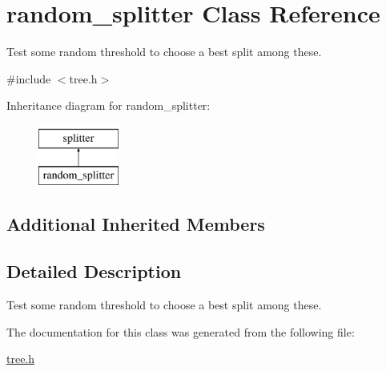 \hypertarget{classrandom__splitter}{\section{random\+\_\+splitter Class Reference}
\label{classrandom__splitter}
}


Test some random threshold to choose a best split among these.  




{\ttfamily \#include $<$tree.\+h$>$}

Inheritance diagram for random\+\_\+splitter\+:\begin{figure}[H]
\begin{center}
\leavevmode
\includegraphics[height=2.000000cm]{classrandom__splitter}
\end{center}
\end{figure}
\subsection*{Additional Inherited Members}


\subsection{Detailed Description}
Test some random threshold to choose a best split among these. 

The documentation for this class was generated from the following file\+:\begin{DoxyCompactItemize}
\item 
\hyperlink{tree_8h}{tree.\+h}\end{DoxyCompactItemize}
